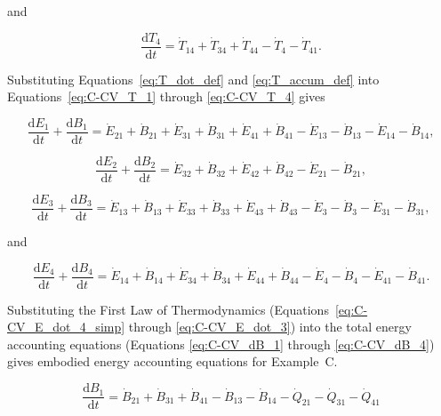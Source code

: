 \noindent and 

\begin{equation} \label{eq:C-CV_T_4}
	\frac{\mathrm{d}T_{4}}{\mathrm{d}t} 	 
	= \dot{T}_{14} 
	+ \dot{T}_{34} 
	+ \dot{T}_{44} 
	- \dot{T}_{4} 
	- \dot{T}_{41}.
\end{equation}

Substituting Equations~\ref{eq:T_dot_def} 
and \ref{eq:T_accum_def} into 
Equations~\ref{eq:C-CV_T_1} through
\ref{eq:C-CV_T_4} gives

\begin{equation} \label{eq:C-CV_dB_1}
	\frac{\mathrm{d}E_{1}}{\mathrm{d}t}
	+ \frac{\mathrm{d}B_{1}}{\mathrm{d}t}
	= \dot{E}_{21} 
	+ \dot{B}_{21} 
	+ \dot{E}_{31} 
	+ \dot{B}_{31} 
	+ \dot{E}_{41} 
	+ \dot{B}_{41} 
	- \dot{E}_{13} 
	- \dot{B}_{13} 
	- \dot{E}_{14} 
	- \dot{B}_{14},
\end{equation}

\begin{equation} \label{eq:C-CV_dB_2}
	\frac{\mathrm{d}E_{2}}{\mathrm{d}t} 
	+ \frac{\mathrm{d}B_{2}}{\mathrm{d}t} 	 
	= \dot{E}_{32} 
	+ \dot{B}_{32} 
	+ \dot{E}_{42} 
	+ \dot{B}_{42} 
	- \dot{E}_{21} 
	- \dot{B}_{21},
\end{equation}

\begin{equation} \label{eq:C-CV_dB_3}
	\frac{\mathrm{d}E_{3}}{\mathrm{d}t} 
	+ \frac{\mathrm{d}B_{3}}{\mathrm{d}t} 	 
	= \dot{E}_{13} 
	+ \dot{B}_{13} 
	+ \dot{E}_{33} 
	+ \dot{B}_{33} 
	+ \dot{E}_{43} 
	+ \dot{B}_{43} 
	- \dot{E}_{3} 
	- \dot{B}_{3} 
	- \dot{E}_{31} 
	- \dot{B}_{31},
\end{equation}

\noindent and 

\begin{equation} \label{eq:C-CV_dB_4}
	\frac{\mathrm{d}E_{4}}{\mathrm{d}t} 
	+ \frac{\mathrm{d}B_{4}}{\mathrm{d}t} 	 
	= \dot{E}_{14} 
	+ \dot{B}_{14} 
	+ \dot{E}_{34} 
	+ \dot{B}_{34}
	+ \dot{E}_{44} 
	+ \dot{B}_{44} 
	- \dot{E}_{4} 
	- \dot{B}_{4} 
	- \dot{E}_{41} 
	- \dot{B}_{41}.
\end{equation}

Substituting the First Law of Thermodynamics 
(Equations~\ref{eq:C-CV_E_dot_4_simp} through \ref{eq:C-CV_E_dot_3}) 
into the total energy accounting equations 
(Equations \ref{eq:C-CV_dB_1} through \ref{eq:C-CV_dB_4}) 
gives embodied energy accounting equations for Example~C.

\begin{equation} \label{eq:C-embodied_acct_1}
	\frac{\mathrm{d}B_{1}}{\mathrm{d}t} 	 
	= \dot{B}_{21} 
	+ \dot{B}_{31} 
	+ \dot{B}_{41} 
	- \dot{B}_{13} 
	- \dot{B}_{14} 
	- \dot{Q}_{21} 
	- \dot{Q}_{31} 
	- \dot{Q}_{41}
\end{equation}

